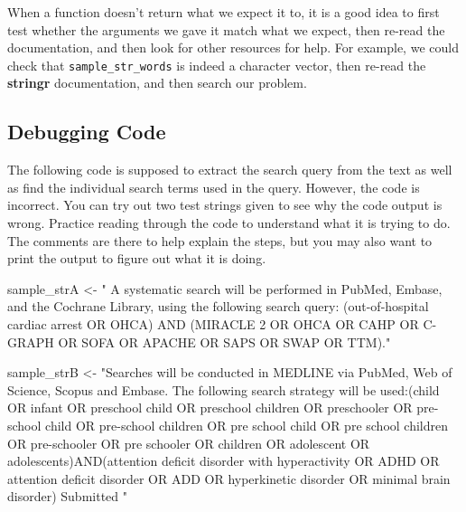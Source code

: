 \documentclass[
  letterpaper,
]{latex/krantz}
\makeatletter
\newenvironment{Shaded}{\begin{snugshade}}{\end{snugshade}}
\newcommand{\NormalTok}[1]{\textcolor[rgb]{0.00,0.23,0.31}{#1}}
\newcommand{\OtherTok}[1]{\textcolor[rgb]{0.00,0.23,0.31}{#1}}
\newcommand{\StringTok}[1]{\textcolor[rgb]{0.13,0.47,0.30}{#1}}
\newenvironment{kframe}{%
\medskip{}
\setlength{\fboxsep}{.8em}
 \def\at@end@of@kframe{}%
 \ifinner\ifhmode%
  \def\at@end@of@kframe{\end{minipage}}%
  \begin{minipage}{\columnwidth}%
 \fi\fi%
 \def\FrameCommand##1{\hskip\@totalleftmargin \hskip-\fboxsep
 \colorbox{shadecolor}{##1}\hskip-\fboxsep
     \hskip-\linewidth \hskip-\@totalleftmargin \hskip\columnwidth}%
 \MakeFramed {\advance\hsize-\width
   \@totalleftmargin\z@ \linewidth\hsize
   \@setminipage}}%
 {\par\unskip\endMakeFramed%
 \at@end@of@kframe}
\renewenvironment{Shaded}{\begin{kframe}}{\end{kframe}}
\makeatother
\begin{document}
When a function doesn't return what we expect it to, it is a good idea
to first test whether the arguments we gave it match what we expect,
then re-read the documentation, and then look for other resources for
help. For example, we could check that \texttt{sample\_str\_words} is
indeed a character vector, then re-read the \textbf{stringr}
documentation, and then search our problem.

\subsection{\texorpdfstring{Debugging Code
}{Debugging Code }}\label{debugging-code}

The following code is supposed to extract the search query from the text
as well as find the individual search terms used in the query. However,
the code is incorrect. You can try out two test strings given to see why
the code output is wrong. Practice reading through the code to
understand what it is trying to do. The comments are there to help
explain the steps, but you may also want to print the output to figure
out what it is doing.

\begin{Shaded}
\begin{Highlighting}[]
\NormalTok{sample\_strA }\OtherTok{\textless{}{-}} \StringTok{" A systematic search will be performed in PubMed, }
\StringTok{Embase, and the Cochrane Library, using the following search query:   }
\StringTok{(\textquotesingle{}out{-}of{-}hospital cardiac arrest\textquotesingle{} OR \textquotesingle{}OHCA\textquotesingle{}) AND (\textquotesingle{}MIRACLE 2\textquotesingle{} OR }
\StringTok{\textquotesingle{}OHCA\textquotesingle{} OR \textquotesingle{}CAHP\textquotesingle{} OR \textquotesingle{}C{-}GRAPH\textquotesingle{} OR \textquotesingle{}SOFA\textquotesingle{} OR \textquotesingle{}APACHE\textquotesingle{} OR \textquotesingle{}SAPS\textquotesingle{} OR }
\StringTok{\textquotesingle{}SWAP\textquotesingle{} OR \textquotesingle{}TTM\textquotesingle{})."}

\NormalTok{sample\_strB }\OtherTok{\textless{}{-}} \StringTok{"Searches will be conducted in MEDLINE via PubMed, Web }
\StringTok{of Science, Scopus and Embase. The following search strategy will be }
\StringTok{used:(child OR infant OR preschool child OR preschool children OR }
\StringTok{preschooler OR pre{-}school child OR pre{-}school children OR pre school }
\StringTok{child OR pre school children OR pre{-}schooler OR pre schooler OR }
\StringTok{children OR adolescent OR adolescents)AND(attention deficit disorder }
\StringTok{with hyperactivity OR ADHD OR attention deficit disorder OR ADD OR }
\StringTok{hyperkinetic disorder OR minimal brain disorder) Submitted "}
\end{Highlighting}
\end{Shaded}
\end{document}
